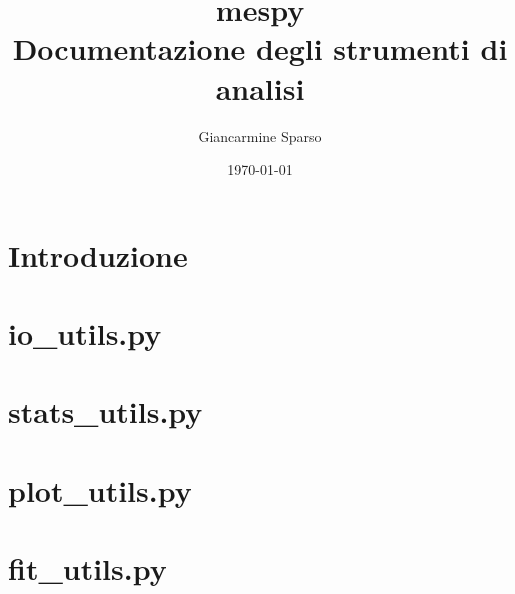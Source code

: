 \documentclass[11pt,a4paper]{report}
\title{mespy\\[0.4em]\large Documentazione degli strumenti di analisi}
\author{Giancarmine Sparso}
\date{\today}
\begin{document}
\maketitle
\tableofcontents
\clearpage


\chapter*{Introduzione}


\chapter{io\_utils.py}

\chapter{stats\_utils.py}


\chapter{plot\_utils.py}


\chapter{fit\_utils.py}

\end{document}
